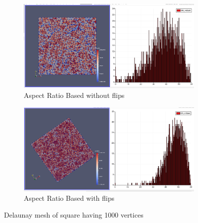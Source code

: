 \begin{figure}[h]
	\ContinuedFloat
    \centering
   	\begin{subfigure}[h]{1.0\textwidth}
        \centering
        \includegraphics[width=\textwidth]{images/aspect_ratio_no_flips_1000.png}
        \caption{Aspect Ratio Based without flips}
    \end{subfigure}
	\vspace{0.5 cm}
	    
    \begin{subfigure}[h]{1.0\textwidth}
        \centering
        \includegraphics[width=\textwidth]{images/aspect_ratio_1000.png}
        \caption{Aspect Ratio Based with flips}    
    \end{subfigure}	  	
    \caption{Delaunay mesh of square having 1000 vertices}
    \label{fig:points_1000}
\end{figure}